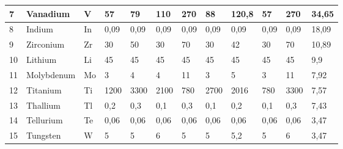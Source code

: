 \begin{table}[H]
{\begin{tabular}{|lll|llllllll|p{}|}
\multicolumn{1}{|l|}{7} & \multicolumn{1}{l|}{Vanadium} & V & \multicolumn{1}{l|}{57} & \multicolumn{1}{l|}{79} & \multicolumn{1}{l|}{110} & \multicolumn{1}{l|}{270} & \multicolumn{1}{l|}{88} & \multicolumn{1}{l|}{120,8} & \multicolumn{1}{l|}{57} & 270 & 34,65 \\ \hline
\multicolumn{1}{|l|}{8} & \multicolumn{1}{l|}{Indium} & In & \multicolumn{1}{l|}{0,09} & \multicolumn{1}{l|}{0,09} & \multicolumn{1}{l|}{0,09} & \multicolumn{1}{l|}{0,09} & \multicolumn{1}{l|}{0,09} & \multicolumn{1}{l|}{0,09} & \multicolumn{1}{l|}{0,09} & 0,09 & 18,09 \\ \hline
\multicolumn{1}{|l|}{9} & \multicolumn{1}{l|}{Zirconium} & Zr & \multicolumn{1}{l|}{30} & \multicolumn{1}{l|}{50} & \multicolumn{1}{l|}{30} & \multicolumn{1}{l|}{70} & \multicolumn{1}{l|}{30} & \multicolumn{1}{l|}{42} & \multicolumn{1}{l|}{30} & 70 & 10,89 \\ \hline
\multicolumn{1}{|l|}{10} & \multicolumn{1}{l|}{Lithium} & Li & \multicolumn{1}{l|}{45} & \multicolumn{1}{l|}{45} & \multicolumn{1}{l|}{45} & \multicolumn{1}{l|}{45} & \multicolumn{1}{l|}{45} & \multicolumn{1}{l|}{45} & \multicolumn{1}{l|}{45} & 45 & 9,9 \\ \hline
\multicolumn{1}{|l|}{11} & \multicolumn{1}{l|}{Molybdenum} & Mo & \multicolumn{1}{l|}{3} & \multicolumn{1}{l|}{4} & \multicolumn{1}{l|}{4} & \multicolumn{1}{l|}{11} & \multicolumn{1}{l|}{3} & \multicolumn{1}{l|}{5} & \multicolumn{1}{l|}{3} & 11 & 7,92 \\ \hline
\multicolumn{1}{|l|}{12} & \multicolumn{1}{l|}{Titanium} & Ti & \multicolumn{1}{l|}{1200} & \multicolumn{1}{l|}{3300} & \multicolumn{1}{l|}{2100} & \multicolumn{1}{l|}{780} & \multicolumn{1}{l|}{2700} & \multicolumn{1}{l|}{2016} & \multicolumn{1}{l|}{780} & 3300 & 7,57 \\ \hline
\multicolumn{1}{|l|}{13} & \multicolumn{1}{l|}{Thallium} & Tl & \multicolumn{1}{l|}{0,2} & \multicolumn{1}{l|}{0,3} & \multicolumn{1}{l|}{0,1} & \multicolumn{1}{l|}{0,3} & \multicolumn{1}{l|}{0,1} & \multicolumn{1}{l|}{0,2} & \multicolumn{1}{l|}{0,1} & 0,3 & 7,43 \\ \hline
\multicolumn{1}{|l|}{14} & \multicolumn{1}{l|}{Tellurium} & Te & \multicolumn{1}{l|}{0,06} & \multicolumn{1}{l|}{0,06} & \multicolumn{1}{l|}{0,06} & \multicolumn{1}{l|}{0,06} & \multicolumn{1}{l|}{0,06} & \multicolumn{1}{l|}{0,06} & \multicolumn{1}{l|}{0,06} & 0,06 & 3,47 \\ \hline
\multicolumn{1}{|l|}{15} & \multicolumn{1}{l|}{Tungsten} & W & \multicolumn{1}{l|}{5} & \multicolumn{1}{l|}{5} & \multicolumn{1}{l|}{6} & \multicolumn{1}{l|}{5} & \multicolumn{1}{l|}{5} & \multicolumn{1}{l|}{5,2} & \multicolumn{1}{l|}{5} & 6 & 3,47 \\ \hline
\end{tabular}%
}
\end{table}

